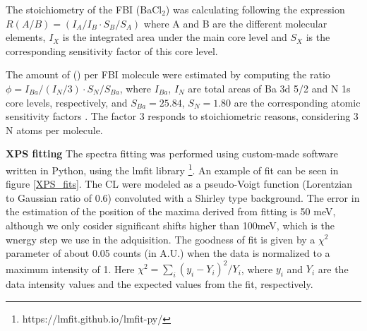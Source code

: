 \documentclass[aps,prl,reprint,longbibliography,superscriptaddress, english]{revtex4-1}
\def\BappCl{BaCl$_2$}
\begin{document}
The stoichiometry of the FBI (\BappCl) was calculating following the expression $ R(A/B)=(I_{A}/I_{B} \cdot S_B/S_{A})$ where A and B are the different molecular elements, $I_{X}$ is the integrated area under the main core level and $S_{X}$ is the corresponding sensitivity factor of this core level.

The amount of \Bapp (\Nap) per FBI molecule were estimated by computing  the ratio $\phi=I_{Ba}/(I_N/3) \cdot S_N/S_{Ba} $, where $I_{Ba}$, $I_N$ are total areas  of Ba 3d 5/2 and  N 1s core  levels, respectively, and $S_{Ba} = 25.84$, $S_N = 1.80$ are the corresponding atomic sensitivity factors \cite{scofield_hartree-slater_1976}. The factor 3 responds to stoichiometric reasons, considering 3 N atoms per molecule.

\textbf{XPS fitting}
The spectra fitting was performed using custom-made software written in Python, using the lmfit library \footnote{https://lmfit.github.io/lmfit-py/}. An example of fit can be seen in figure \ref{XPS_fits}. The CL were modeled as a pseudo-Voigt function (Lorentzian to Gaussian ratio of 0.6) convoluted with a Shirley type background. The error in the estimation of the position of the maxima derived from fitting is 50 meV, although we only cosider significant shifts higher than 100meV, which is the wnergy step we use in the adquisition. The goodness of fit is given by a $\chi^2$ parameter of about 0.05 counts (in A.U.) when the data is normalized to a maximum intensity of 1. Here $\chi^2 = \sum_i (y_i- Y_i)^2/Y_i$, where $y_i$ and $Y_i$ are the data intensity values and the expected values from the fit, respectively.
\end{document}
